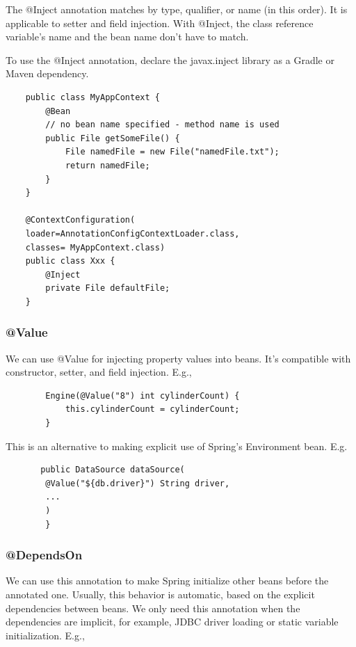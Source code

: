 \documentclass{scrartcl}
\begin{document}
The @Inject annotation matches by type, qualifier, or name (in this order). It is applicable to setter and field injection. With @Inject, the class reference variable's name and the bean name don’t have to match.

To use the @Inject annotation, declare the javax.inject library as a Gradle or Maven dependency.

\begin{lstlisting}
    public class MyAppContext {
        @Bean
        // no bean name specified - method name is used
        public File getSomeFile() {
            File namedFile = new File("namedFile.txt");
            return namedFile;
        }
    }

    @ContextConfiguration(
    loader=AnnotationConfigContextLoader.class,
    classes= MyAppContext.class)
    public class Xxx {
        @Inject
        private File defaultFile;
    }
\end{lstlisting}

\subsubsection{@Value}

    We can use @Value for injecting property values into beans. It’s compatible with constructor, setter, and field injection. E.g.,

    \begin{lstlisting}
        Engine(@Value("8") int cylinderCount) {
            this.cylinderCount = cylinderCount;
        }
    \end{lstlisting}

    This is an alternative to making explicit use of Spring's Environment bean. E.g.

    \begin{lstlisting}
       public DataSource dataSource(
        @Value("${db.driver}") String driver,
        ...
        )
        }
    \end{lstlisting}

\subsubsection{@DependsOn}

    We can use this annotation to make Spring initialize other beans before the annotated one. Usually, this behavior is automatic, based on the explicit dependencies between beans. We only need this annotation when the dependencies are implicit, for example, JDBC driver loading or static variable initialization. E.g.,
\end{document}
